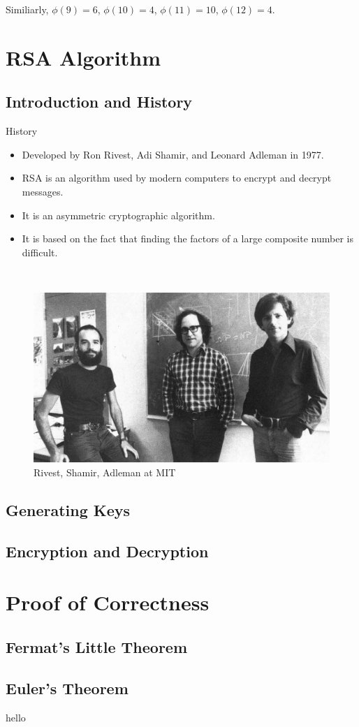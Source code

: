 \documentclass{beamer}
\begin{document}
\begin{frame}
	Similiarly, $\phi(9) = 6$, $\phi(10) = 4$, $\phi(11) = 10$, $\phi(12) = 4$.
\end{frame}

\section{RSA Algorithm}
\subsection{Introduction and History}
\begin{frame}
	{History}
	\begin{itemize}
		\item Developed by Ron Rivest, Adi Shamir, and Leonard Adleman in 1977.
		\item RSA is an algorithm used by modern computers to encrypt and decrypt messages.
		\item It is an asymmetric cryptographic algorithm.
		\item It is based on the fact that finding the factors of a large composite number is difficult.
	\end{itemize}
\end{frame}

\begin{frame}
	~\\
	\begin{figure}[!ht]
		\centering
		\includegraphics[scale=0.2]{rsa.jpg}
		\caption{Rivest, Shamir, Adleman at MIT}
		\label{fig:rsa}
	\end{figure}
\end{frame}

\subsection{Generating Keys}
\subsection{Encryption and Decryption}

\section{Proof of Correctness}
\subsection{Fermat's Little Theorem}
\subsection{Euler's Theorem}
\begin{frame}
	hello
\end{frame}
\end{document}
